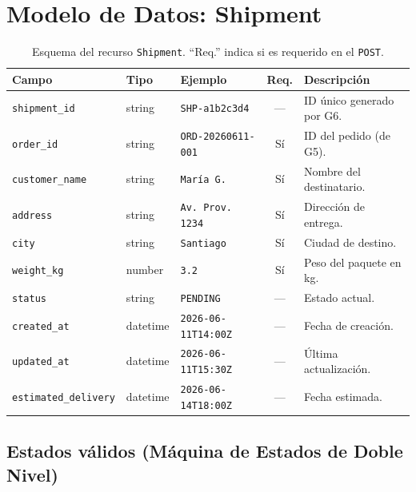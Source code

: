 \documentclass[11pt, a4paper]{article}
\begin{document}
\section{Modelo de Datos: Shipment}
\label{sec:modelo}

\begin{table}[h!]
\centering
\renewcommand{\arraystretch}{1.3}
\begin{tabularx}{\textwidth}{l l l c X}
  \toprule
  \textbf{Campo} & \textbf{Tipo} & \textbf{Ejemplo} & \textbf{Req.} & \textbf{Descripción} \\
  \midrule
  \texttt{shipment\_id}        & string   & \texttt{SHP-a1b2c3d4}        & ---  & ID único generado por G6. \\
  \texttt{order\_id}           & string   & \texttt{ORD-20260611-001}     & Sí   & ID del pedido (de G5). \\
  \texttt{customer\_name}      & string   & \texttt{María G.}             & Sí   & Nombre del destinatario. \\
  \texttt{address}             & string   & \texttt{Av. Prov. 1234}       & Sí   & Dirección de entrega. \\
  \texttt{city}                & string   & \texttt{Santiago}             & Sí   & Ciudad de destino. \\
  \texttt{weight\_kg}          & number   & \texttt{3.2}                  & Sí   & Peso del paquete en kg. \\
  \texttt{status}              & string   & \texttt{PENDING}              & ---  & Estado actual. \\
  \texttt{created\_at}         & datetime & \texttt{2026-06-11T14:00Z}    & ---  & Fecha de creación. \\
  \texttt{updated\_at}         & datetime & \texttt{2026-06-11T15:30Z}    & ---  & Última actualización. \\
  \texttt{estimated\_delivery} & datetime & \texttt{2026-06-14T18:00Z}    & ---  & Fecha estimada. \\
  \bottomrule
\end{tabularx}
\caption{Esquema del recurso \texttt{Shipment}. ``Req.'' indica si es requerido en el \texttt{POST}.}
\end{table}


\subsection{Estados válidos (Máquina de Estados de Doble Nivel)}
\label{sec:estados}
\end{document}
